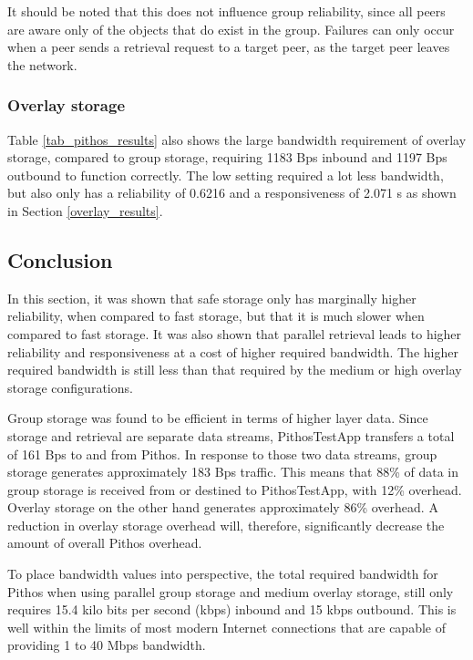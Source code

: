 It should be noted that this does not influence group reliability, since all peers are aware only of the objects that do exist in the group. Failures can only occur when a peer sends a retrieval request to a target peer, as the target peer leaves the network.

\subsubsection{Overlay storage}
Table \ref{tab_pithos_results} also shows the large bandwidth requirement of overlay storage, compared to group storage, requiring 1183 Bps inbound and 1197 Bps outbound to function correctly. The low setting required a lot less bandwidth, but also only has a reliability of 0.6216 and a responsiveness of 2.071 s as shown in Section \ref{overlay_results}.

\subsection{Conclusion}

In this section, it was shown that safe storage only has marginally higher reliability, when compared to fast storage, but that it is much slower when compared to fast storage. It was also shown that parallel retrieval leads to higher reliability and responsiveness at a cost of higher required bandwidth. The higher required bandwidth is still less than that required by the medium or high overlay storage configurations.

Group storage was found to be efficient in terms of higher layer data. Since storage and retrieval are separate data streams, PithosTestApp transfers a total of 161 Bps to and from Pithos. In response to those two data streams, group storage generates approximately 183 Bps traffic. This means that 88\% of data in group storage is received from or destined to PithosTestApp, with 12\% overhead. Overlay storage on the other hand generates approximately 86\% overhead. A reduction in overlay storage overhead will, therefore, significantly decrease the amount of overall Pithos overhead.

To place bandwidth values into perspective, the total required bandwidth for Pithos when using parallel group storage and medium overlay storage, still only requires 15.4 kilo bits per second (kbps) inbound and 15 kbps outbound. This is well within the limits of most modern Internet connections that are capable of providing 1 to 40 Mbps bandwidth.

